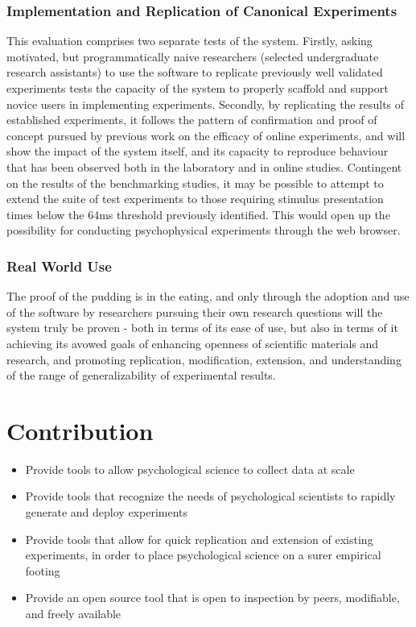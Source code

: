 \documentclass[12pt,a4paper,titlepage]{scrreprt}
\begin{document}
\subsection{Implementation and Replication of Canonical Experiments}
This evaluation comprises two separate tests of the system. Firstly, asking motivated, but programmatically naive researchers (selected undergraduate research assistants) to use the software to replicate previously well validated experiments tests the capacity of the system to properly scaffold and support novice users in implementing experiments.
Secondly, by replicating the results of established experiments, it follows the pattern of confirmation and proof of concept pursued by previous work on the efficacy of online experiments\cite{germine_is_2012,crump_evaluating_2013}, and will show the impact of the system itself, and its capacity to reproduce behaviour that has been observed  both in the laboratory and in online studies.
Contingent on the results of the benchmarking studies, it may be possible to attempt to extend the suite of test experiments to those requiring stimulus presentation times below the 64ms threshold previously identified\cite{crump_evaluating_2013}. This would open up the possibility for conducting psychophysical experiments through the web browser.
\subsection{Real World Use}
The proof of the pudding is in the eating, and only through the adoption and use of the software by researchers pursuing their own research questions will the system truly be proven - both in terms of its ease of use, but also in terms of it achieving its avowed goals of enhancing openness of scientific materials and research, and promoting replication, modification, extension, and understanding of the range of generalizability of experimental results.
\chapter{Contribution}
\begin{itemize}
\item Provide tools to allow psychological science to collect data at scale
\item Provide tools that recognize the needs of psychological scientists to rapidly generate and deploy experiments
\item Provide tools that allow for quick replication and extension of existing experiments, in order to place psychological science on a surer empirical footing
\item Provide an open source tool that is open to inspection by peers, modifiable, and freely available
\end{itemize}
      
    
    {}
\end{document}
